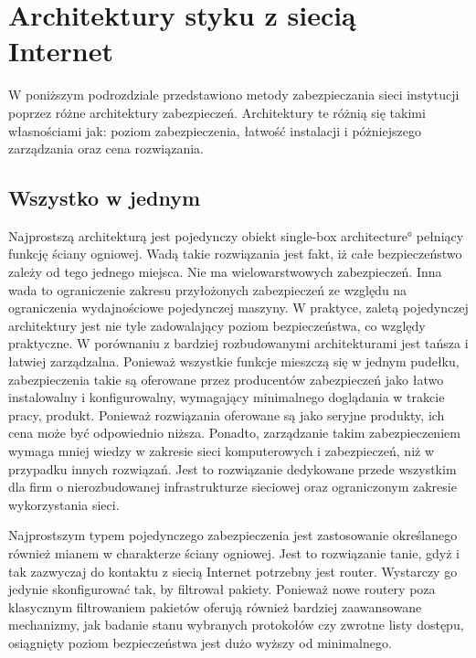 \section{Architektury styku z siecią Internet}

W poniższym podrozdziale przedstawiono metody zabezpieczania sieci
instytucji poprzez różne architektury zabezpieczeń. Architektury te różnią
się takimi własnościami jak: poziom zabezpieczenia, łatwość instalacji i
póżniejszego zarządzania oraz cena rozwiązania.

\subsection{Wszystko w jednym}

Najprostszą architekturą jest pojedynczy obiekt \ang{single-box
architecture} pełniący funkcję ściany ogniowej. Wadą takie rozwiązania jest
fakt, iż całe bezpieczeństwo zależy od tego jednego miejsca. Nie ma
wielowarstwowych zabezpieczeń. Inna wada to ograniczenie zakresu
przyłożonych zabezpieczeń ze względu na ograniczenia wydajnościowe
pojedynczej maszyny. W praktyce, zaletą pojedynczej architektury jest nie
tyle zadowalający poziom bezpieczeństwa, co względy praktyczne. W porównaniu
z bardziej rozbudowanymi architekturami jest tańsza i łatwiej
zarządzalna. Ponieważ wszystkie funkcje mieszczą się w jednym pudełku,
zabezpieczenia takie są oferowane przez producentów zabezpieczeń jako
łatwo instalowalny i konfigurowalny, wymagający minimalnego doglądania w
trakcie pracy, produkt. Ponieważ rozwiązania oferowane są jako seryjne
produkty, ich cena może być odpowiednio niższa. Ponadto, zarządzanie takim
zabezpieczeniem wymaga mniej wiedzy w zakresie sieci komputerowych i
zabezpieczeń, niż w przypadku innych rozwiązań. Jest to rozwiązanie
dedykowane przede wszystkim dla firm o nierozbudowanej infrastrukturze
sieciowej oraz ograniczonym zakresie wykorzystania sieci.

Najprostszym typem pojedynczego zabezpieczenia jest zastosowanie  określanego również mianem  w
charakterze ściany ogniowej. Jest to rozwiązanie tanie, gdyż i tak zazwyczaj
do kontaktu z siecią Internet potrzebny jest router.  Wystarczy go jedynie
skonfigurować tak, by filtrował pakiety. Ponieważ nowe routery poza
klasycznym filtrowaniem pakietów oferują również bardziej zaawansowane
mechanizmy, jak badanie stanu wybranych protokołów czy zwrotne listy
dostępu, osiągnięty poziom bezpieczeństwa jest dużo wyższy od minimalnego.

